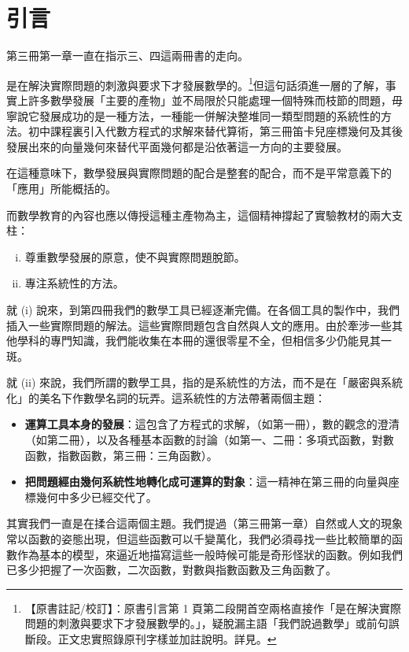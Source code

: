 \section*{引\qquad 言}
\label{sec:b4s_preface}

第三冊第一章一直在指示三、四這兩冊書的走向。

\label{note:b4s-preface-p1-subject}是在解決實際問題的刺激與要求下才發展數學的。\footnote{【原書註記/校訂】：原書引言第 1 頁第二段開首空兩格直接作「是在解決實際問題的刺激與要求下才發展數學的。」，疑脫漏主語「我們說過數學」或前句誤斷段。正文忠實照錄原刊字樣並加註說明。詳見\errataref。}但這句話須進一層的了解，事實上許多數學發展「主要的產物」並不局限於只能處理一個特殊而枝節的問題，毋寧說它發展成功的是一種方法，一種能一併解決整堆同一類型問題的系統性的方法。初中課程裏引入代數方程式的求解來替代算術，第三冊笛卡兒座標幾何及其後發展出來的向量幾何來替代平面幾何都是沿依著這一方向的主要發展。

在這種意味下，數學發展與實際問題的配合是整套的配合，而不是平常意義下的「應用」所能概括的。

而數學教育的內容也應以傳授這種主產物為主，這個精神撐起了實驗教材的兩大支柱：
\begin{enumerate}[(i)]
  \item 尊重數學發展的原意，使不與實際問題脫節。
  \item 專注系統性的方法。
\end{enumerate}

就 (i) 說來，到第四冊我們的數學工具已經逐漸完備。在各個工具的製作中，我們插入一些實際問題的解法。這些實際問題包含自然與人文的應用。由於牽涉一些其他學科的專門知識，我們能收集在本冊的還很零星不全，但相信多少仍能見其一斑。

就 (ii) 來說，我們所謂的數學工具，指的是系統性的方法，而不是在「嚴密與系統化」的美名下作數學名詞的玩弄。這系統性的方法帶著兩個主題：
\begin{itemize}[leftmargin=3em]
  \item[(一)] \textbf{運算工具本身的發展}：這包含了方程式的求解，（如第一冊），數的觀念的澄清（如第二冊），以及各種基本函數的討論（如第一、二冊：多項式函數，對數函數，指數函數，第三冊：三角函數）。
  \item[(二)] \textbf{把問題經由幾何系統性地轉化成可運算的對象}：這一精神在第三冊的向量與座標幾何中多少已經交代了。
\end{itemize}

其實我們一直是在揉合這兩個主題。我們提過（第三冊第一章）自然或人文的現象常以函數的姿態出現，但這些函數可以千變萬化，我們必須尋找一些比較簡單的函數作為基本的模型，來逼近地描寫這些一般時候可能是奇形怪狀的函數。例如我們已多少把握了一次函數，二次函數，對數與指數函數及三角函數了。

